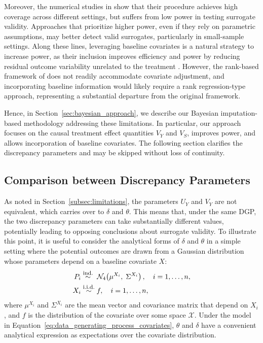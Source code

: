 \documentclass[referee,usenatbib]{biom}
\newcommand{\iid}{\overset{\text{\footnotesize i.i.d.}}{\sim}}
\begin{document}
Moreover, the numerical studies in \citet{parast2024rank} show that their procedure achieves high coverage across different settings, but suffers from low power in testing surrogate validity. Approaches that prioritize higher power, even if they rely on parametric assumptions, may better detect valid surrogates, particularly in small-sample settings. Along these lines, leveraging baseline covariates is a natural strategy to increase power, as their inclusion improves efficiency and power by reducing residual outcome variability unrelated to the treatment \citep{zhang2008improving, colantuoni2015leveraging, zhang2019machine}. However, the rank-based framework of \citet{parast2024rank} does not readily accommodate covariate adjustment, and incorporating baseline information would likely require a rank regression-type approach, representing a substantial departure from the original framework.

Hence, in Section~\ref{sec:bayesian_approach}, we describe our Bayesian imputation-based methodology addressing these limitations. In particular, our approach focuses on the causal treatment effect quantities \(V_{Y}\) and \(V_{S}\), improves power, and allows incorporation of baseline covariates. The following section clarifies the discrepancy parameters and may be skipped without loss of continuity.

\subsection{Comparison between Discrepancy Parameters}\label{subsec:comparison_parameters}

As noted in Section~\ref{subsec:limitations}, the parameters \(U_{Y}\) and \(V_{Y}\) are not equivalent, which carries over to \(\delta\) and \(\theta\). This means that, under the same DGP, the two discrepancy parameters can take substantially different values, potentially leading to opposing conclusions about surrogate validity. To illustrate this point, it is useful to consider the analytical forms of \(\delta\) and \(\theta\) in a simple setting where the potential outcomes are drawn from a Gaussian distribution whose parameters depend on a baseline covariate \(X\):
\begin{equation}
  \label{eq:data_generating_process_covariates}
  \begin{aligned}
    P_{i} &\overset{\text{\footnotesize ind.}}{\sim}\;
    \mathcal{N}_{4}\!\left( \mu^{X_{i}} ,\; \Sigma^{X_{i}} \right), \quad i=1,\ldots,n, \\
    X_{i} &\iid f, \quad i = 1, \ldots, n,
  \end{aligned}
\end{equation}
where \(\mu^{X_{i}}\) and \(\Sigma^{X_{i}}\) are the mean vector and covariance matrix that depend on \(X_{i}\), and \(f\) is the distribution of the covariate over some space \(\mathcal{X}\). Under the model in Equation~\eqref{eq:data_generating_process_covariates}, \(\theta\) and \(\delta\) have a convenient analytical expression as expectations over the covariate distribution.
\end{document}
